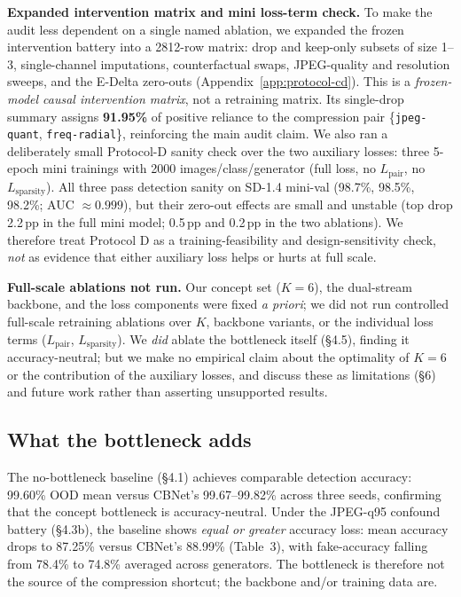 \textbf{Expanded intervention matrix and mini loss-term check.} To make the audit less dependent on a single named ablation, we expanded the frozen intervention battery into a 2812-row matrix: drop and keep-only subsets of size 1--3, single-channel imputations, counterfactual swaps, JPEG-quality and resolution sweeps, and the E-Delta zero-outs (Appendix~\ref{app:protocol-cd}). This is a \emph{frozen-model causal intervention matrix}, not a retraining matrix. Its single-drop summary assigns \textbf{91.95\%} of positive reliance to the compression pair \{\texttt{jpeg-quant}, \texttt{freq-radial}\}, reinforcing the main audit claim. We also ran a deliberately small Protocol-D sanity check over the two auxiliary losses: three 5-epoch mini trainings with 2000 images/class/generator (full loss, no \(L_{\text{pair}}\), no \(L_{\text{sparsity}}\)). All three pass detection sanity on SD-1.4 mini-val (98.7\%, 98.5\%, 98.2\%; AUC \(\approx0.999\)), but their zero-out effects are small and unstable (top drop 2.2\,pp in the full mini model; 0.5\,pp and 0.2\,pp in the two ablations). We therefore treat Protocol D as a training-feasibility and design-sensitivity check, \emph{not} as evidence that either auxiliary loss helps or hurts at full scale.

\textbf{Full-scale ablations not run.} Our concept set (\(K{=}6\)), the dual-stream backbone, and the loss components were fixed \emph{a priori}; we did not run controlled full-scale retraining ablations over \(K\), backbone variants, or the individual loss terms (\(L_{\text{pair}}\), \(L_{\text{sparsity}}\)). We \emph{did} ablate the bottleneck itself (\S{}4.5), finding it accuracy-neutral; but we make no empirical claim about the optimality of \(K{=}6\) or the contribution of the auxiliary losses, and discuss these as limitations (\S{}6) and future work rather than asserting unsupported results.

\subsection{What the bottleneck adds}

The no-bottleneck baseline (\S{}4.1) achieves comparable detection accuracy: 99.60\% OOD mean versus CBNet's 99.67--99.82\% across three seeds, confirming that the concept bottleneck is accuracy-neutral. Under the JPEG-q95 confound battery (\S{}4.3b), the baseline shows \emph{equal or greater} accuracy loss: mean accuracy drops to 87.25\% versus CBNet's 88.99\% (Table~3), with fake-accuracy falling from 78.4\% to 74.8\% averaged across generators. The bottleneck is therefore not the source of the compression shortcut; the backbone and/or training data are.

